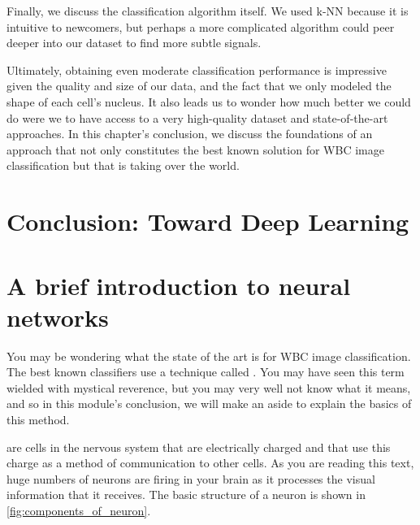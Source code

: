 \begin{qbox}\end{qbox}

Finally, we discuss the classification algorithm itself. We used k-NN because it is intuitive to newcomers, but perhaps a more complicated algorithm could peer deeper into our dataset to find more subtle signals.

Ultimately, obtaining even moderate classification performance is impressive given the quality and size of our data, and the fact that we only modeled the shape of each cell's nucleus. It also leads us to wonder how much better we could do were we to have access to a very high-quality dataset and state-of-the-art approaches. In this chapter's conclusion, we discuss the foundations of an approach that not only constitutes the best known solution for WBC image classification but that is taking over the world.\\

\FloatBarrier
{}
\section{Conclusion: Toward Deep Learning}
\label{sec:conclusion}

\section{A brief introduction to neural networks}

You may be wondering what the state of the art is for WBC image classification. The best known classifiers use a technique called . You may have seen this term wielded with mystical reverence, but you may very well not know what it means, and so in this module's conclusion, we will make an aside to explain the basics of this method.

 are cells in the nervous system that are electrically charged and that use this charge as a method of communication to other cells. As you are reading this text, huge numbers of neurons are firing in your brain as it processes the visual information that it receives. The basic structure of a neuron is shown in \autoref{fig:components_of_neuron}.\\

